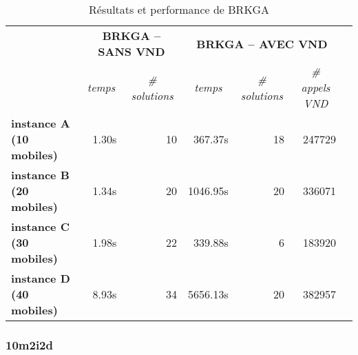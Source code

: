             \begin{table}[H]
                \centering
                \begin{tabular}{r|r|r|r|r|r|l}
                \cline{2-6}
                \multicolumn{1}{l|}{\multirow{2}{*}{}}                 & \multicolumn{2}{c|}{\textbf{BRKGA -- SANS VND}}                                  & \multicolumn{3}{c|}{\textbf{BRKGA -- AVEC VND}}                                                                                &  \\ \cline{2-6}
                \multicolumn{1}{l|}{}                                  & \multicolumn{1}{c|}{\textit{temps}} & \multicolumn{1}{c|}{\textit{\# solutions}} & \multicolumn{1}{c|}{\textit{temps}} & \multicolumn{1}{c|}{\textit{\# solutions}} & \multicolumn{1}{c|}{\textit{\# appels VND}} &  \\ \cline{1-6}
                \multicolumn{1}{|l|}{\textbf{instance A (10 mobiles)}} & 1.30s                               & 10                                         & 367.37s                             & 18                                         & 247729                                      &  \\ \cline{1-6}
                \multicolumn{1}{|l|}{\textbf{instance B (20 mobiles)}} & 1.34s                               & 20                                         & 1046.95s                            & 20                                         & 336071                                      &  \\ \cline{1-6}
                \multicolumn{1}{|l|}{\textbf{instance C (30 mobiles)}} & 1.98s                               & 22                                         & 339.88s                             & 6                                          & 183920                                      &  \\ \cline{1-6}
                \multicolumn{1}{|l|}{\textbf{instance D (40 mobiles)}} & 8.93s                               & 34                                         & 5656.13s                            & 20                                         & 382957                                      &  \\ \cline{1-6}
                \end{tabular}
                \caption{Résultats et performance de BRKGA}
                \label{tab:brkga}
            \end{table}
            \subsubsection{10m2i2d}
                
                
